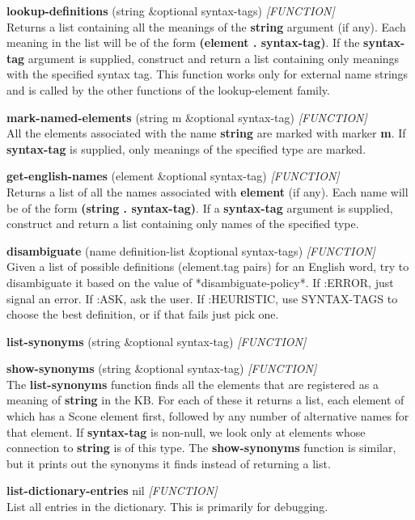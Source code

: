 \documentclass[titlepage,twoside,openright,11pt]{article}
\begin{document}
\textbf{lookup-definitions} (string \&optional syntax-tags)
\emph{{[}FUNCTION{]}}\\
Returns a list containing all the meanings of the \textbf{string}
argument (if any). Each meaning in the list will be of the form
\textbf{(element . syntax-tag)}. If the \textbf{syntax-tag} argument is
supplied, construct and return a list containing only meanings with the
specified syntax tag. This function works only for external name strings
and is called by the other functions of the lookup-element family.

\textbf{mark-named-elements} (string m \&optional syntax-tag)
\emph{{[}FUNCTION{]}}\\
All the elements associated with the name \textbf{string} are marked
with marker \textbf{m}. If \textbf{syntax-tag} is supplied, only
meanings of the specified type are marked.

\textbf{get-english-names} (element \&optional syntax-tag)
\emph{{[}FUNCTION{]}}\\
Returns a list of all the names associated with \textbf{element} (if
any). Each name will be of the form \textbf{(string . syntax-tag)}. If a
\textbf{syntax-tag} argument is supplied, construct and return a list
containing only names of the specified type.

\textbf{disambiguate} (name definition-list \&optional syntax-tags)
\emph{{[}FUNCTION{]}}\\
Given a list of possible definitions (element.tag pairs) for an English
word, try to disambiguate it based on the value of
*disambiguate-policy*. If :ERROR, just signal an error. If :ASK, ask the
user. If :HEURISTIC, use SYNTAX-TAGS to choose the best definition, or
if that fails just pick one.

\textbf{list-synonyms} (string \&optional syntax-tag)
\emph{{[}FUNCTION{]}}

\textbf{show-synonyms} (string \&optional syntax-tag)
\emph{{[}FUNCTION{]}}\\
The \textbf{list-synonyms} function finds all the elements that are
registered as a meaning of \textbf{string} in the KB. For each of these
it returns a list, each element of which has a Scone element first,
followed by any number of alternative names for that element. If
\textbf{syntax-tag} is non-null, we look only at elements whose
connection to \textbf{string} is of this type. The
\textbf{show-synonyms} function is similar, but it prints out the
synonyms it finds instead of returning a list.

\textbf{list-dictionary-entries} nil \emph{{[}FUNCTION{]}}\\
List all entries in the dictionary. This is primarily for debugging.
\end{document}
